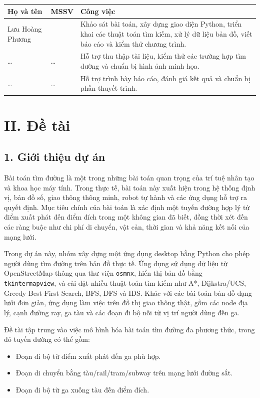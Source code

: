 \documentclass[12pt,a4paper]{article}
\begin{document}
\begin{longtable}{|>{\centering\arraybackslash}p{4cm}|>{\centering\arraybackslash}p{2.5cm}|p{8cm}|}
\hline
\textbf{Họ và tên} & \textbf{MSSV} & \textbf{Công việc}\\
\hline
Lưu Hoàng Phương & 202416317 &
Khảo sát bài toán, xây dựng giao diện Python, triển khai các thuật toán tìm kiếm, xử lý dữ liệu bản đồ, viết báo cáo và kiểm thử chương trình.\\
\hline
\ldots & \ldots &
Hỗ trợ thu thập tài liệu, kiểm thử các trường hợp tìm đường và chuẩn bị hình ảnh minh họa.\\
\hline
\ldots & \ldots &
Hỗ trợ trình bày báo cáo, đánh giá kết quả và chuẩn bị phần thuyết trình.\\
\hline
\end{longtable}

\section*{II. Đề tài}

\subsection*{1. Giới thiệu dự án}

Bài toán tìm đường là một trong những bài toán quan trọng của trí tuệ nhân tạo và khoa học máy tính. Trong thực tế, bài toán này xuất hiện trong hệ thống định vị, bản đồ số, giao thông thông minh, robot tự hành và các ứng dụng hỗ trợ ra quyết định. Mục tiêu chính của bài toán là xác định một tuyến đường hợp lý từ điểm xuất phát đến điểm đích trong một không gian đã biết, đồng thời xét đến các ràng buộc như chi phí di chuyển, vật cản, thời gian và khả năng kết nối của mạng lưới.

Trong dự án này, nhóm xây dựng một ứng dụng desktop bằng Python cho phép người dùng tìm đường trên bản đồ thực tế. Ứng dụng sử dụng dữ liệu từ OpenStreetMap thông qua thư viện \texttt{osmnx}, hiển thị bản đồ bằng \texttt{tkintermapview}, và cài đặt nhiều thuật toán tìm kiếm như A*, Dijkstra/UCS, Greedy Best-First Search, BFS, DFS và IDS. Khác với các bài toán bản đồ dạng lưới đơn giản, ứng dụng làm việc trên đồ thị giao thông thật, gồm các node địa lý, cạnh đường ray, ga tàu và các đoạn đi bộ nối từ vị trí người dùng đến ga.

Đề tài tập trung vào việc mô hình hóa bài toán tìm đường đa phương thức, trong đó tuyến đường có thể gồm:
\begin{itemize}
    \item Đoạn đi bộ từ điểm xuất phát đến ga phù hợp.
    \item Đoạn di chuyển bằng tàu/rail/tram/subway trên mạng lưới đường sắt.
    \item Đoạn đi bộ từ ga xuống tàu đến điểm đích.
\end{itemize}
\end{document}

